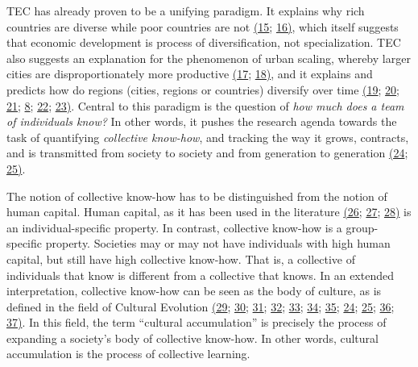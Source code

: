 \documentclass{pnastwo}
\begin{document}
\begin{article}
TEC has already proven to be a unifying paradigm. It explains why rich countries are diverse while poor countries are not \hyperref[csl:15]{(15}; \hyperref[csl:16]{16)}, which itself suggests that economic development is process of diversification, not specialization. TEC also suggests an explanation for the phenomenon of urban scaling, whereby larger cities are disproportionately more productive \hyperref[csl:17]{(17}; \hyperref[csl:18]{18)}, and it explains and predicts how do regions (cities, regions or countries) diversify over time \hyperref[csl:19]{(19}; \hyperref[csl:20]{20}; \hyperref[csl:21]{21}; \hyperref[csl:8]{8}; \hyperref[csl:22]{22}; \hyperref[csl:23]{23)}. Central to this paradigm is the question of \emph{how much does a team of individuals know?} In other words, it pushes the research agenda towards the task of quantifying \emph{collective know-how}, and tracking the way it grows, contracts, and is transmitted from society to society and from generation to generation \hyperref[csl:24]{(24}; \hyperref[csl:25]{25)}. 

The notion of collective know-how has to be distinguished from the notion of human capital. Human capital, as it has been used in the literature \hyperref[csl:26]{(26}; \hyperref[csl:27]{27}; \hyperref[csl:28]{28)} is an individual-specific property. In contrast, collective know-how is a group-specific property. Societies may or may not have individuals with high human capital, but still have high collective know-how. That is, a collective of individuals that know is different from a collective that knows. In an extended interpretation, collective know-how can be seen as the body of culture, as is defined in the field of Cultural Evolution \hyperref[csl:29]{(29}; \hyperref[csl:30]{30}; \hyperref[csl:31]{31}; \hyperref[csl:32]{32}; \hyperref[csl:33]{33}; \hyperref[csl:34]{34}; \hyperref[csl:35]{35}; \hyperref[csl:24]{24}; \hyperref[csl:25]{25}; \hyperref[csl:36]{36}; \hyperref[csl:37]{37)}. In this field, the term ``cultural accumulation'' is precisely the process of expanding a society's body of collective know-how. In other words, cultural accumulation is the process of collective learning.


\end{article}
\end{document}
